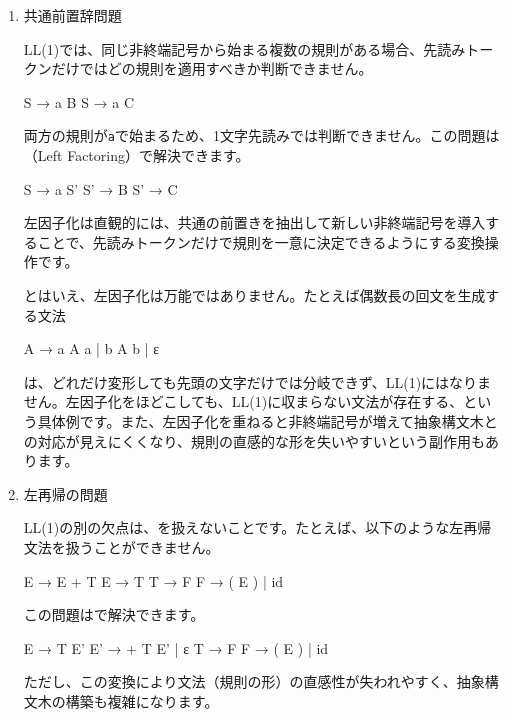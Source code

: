 \begin{enumerate}
\item
  共通前置辞問題

LL(1)では、同じ非終端記号から始まる複数の規則がある場合、先読みトークンだけではどの規則を適用すべきか判断できません。

\begin{codescreen}{}
S → a B
S → a C
\end{codescreen}

両方の規則が\texttt{a}で始まるため、1文字先読みでは判断できません。この問題は（Left
Factoring）で解決できます。

\begin{codescreen}{}
S  → a S'
S' → B
S' → C
\end{codescreen}

左因子化は直観的には、共通の前置きを抽出して新しい非終端記号を導入することで、先読みトークンだけで規則を一意に決定できるようにする変換操作です。

とはいえ、左因子化は万能ではありません。たとえば偶数長の回文を生成する文法

\begin{codescreen}{}
A → a A a | b A b | ε
\end{codescreen}

\noindent は、どれだけ変形しても先頭の文字だけでは分岐できず、LL(1)にはなりません。左因子化をほどこしても、LL(1)に収まらない文法が存在する、という具体例です。また、左因子化を重ねると非終端記号が増えて抽象構文木との対応が見えにくくなり、規則の直感的な形を失いやすいという副作用もあります。

\item
  左再帰の問題

LL(1)の別の欠点は、を扱えないことです。たとえば、以下のような左再帰文法を扱うことができません。

\begin{codescreen}{}
E → E + T
E → T
T → F
F → ( E ) | id
\end{codescreen}

この問題はで解決できます。

\begin{codescreen}{}
E → T E'
E' → + T E' | ε
T → F
F → ( E ) | id
\end{codescreen}

ただし、この変換により文法（規則の形）の直感性が失われやすく、抽象構文木の構築も複雑になります。
\end{enumerate}

